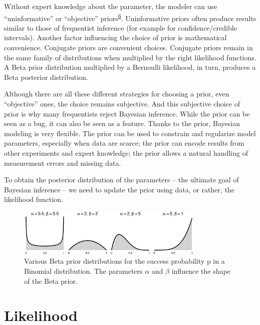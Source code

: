 \documentclass[
  10pt,
]{scrbook}
\begin{document}
Without expert knowledge about the parameter, the modeler can use ``uninformative'' or ``objective'' priors\textsuperscript{\protect\hyperlink{ref-yang1996catalog}{6}}.
Uninformative priors often produce results similar to those of frequentist inference (for example for confidence/credible intervals).
Another factor influencing the choice of prior is mathematical convenience.
Conjugate priors are convenient choices.
Conjugate priors remain in the same family of distributions when multiplied by the right likelihood functions.
A Beta prior distribution multiplied by a Bernoulli likelihood, in turn, produces a Beta posterior distribution.

Although there are all these different strategies for choosing a prior, even ``objective'' ones, the choice remains subjective.
And this subjective choice of prior is why many frequentists reject Bayesian inference.
While the prior can be seen as a bug, it can also be seen as a feature.
Thanks to the prior, Bayesian modeling is very flexible.
The prior can be used to constrain and regularize model parameters, especially when data are scarce;
the prior can encode results from other experiments and expert knowledge;
the prior allows a natural handling of measurement errors and missing data.

To obtain the posterior distribution of the parameters -- the ultimate goal of Bayesian inference -- we need to update the prior using data, or rather, the likelihood function.

\begin{figure}

{\centering \includegraphics[width=0.8\textwidth]{figures/priors-1} 

}

\caption{Various Beta prior distributions for the success probability p in a Binomial distribution. The parameters $\alpha$ and $\beta$ influence the shape of the Beta prior.}\label{fig:priors}
\end{figure}

\hypertarget{likelihood}{%
\section{Likelihood}\label{likelihood}}
\end{document}
